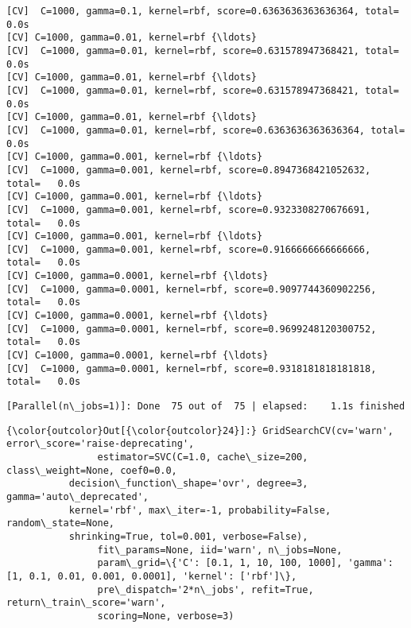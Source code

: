 \documentclass[11pt]{article}
\begin{document}
\begin{Verbatim}[commandchars=\\\{\}]
[CV]  C=1000, gamma=0.1, kernel=rbf, score=0.6363636363636364, total=   0.0s
[CV] C=1000, gamma=0.01, kernel=rbf {\ldots}
[CV]  C=1000, gamma=0.01, kernel=rbf, score=0.631578947368421, total=   0.0s
[CV] C=1000, gamma=0.01, kernel=rbf {\ldots}
[CV]  C=1000, gamma=0.01, kernel=rbf, score=0.631578947368421, total=   0.0s
[CV] C=1000, gamma=0.01, kernel=rbf {\ldots}
[CV]  C=1000, gamma=0.01, kernel=rbf, score=0.6363636363636364, total=   0.0s
[CV] C=1000, gamma=0.001, kernel=rbf {\ldots}
[CV]  C=1000, gamma=0.001, kernel=rbf, score=0.8947368421052632, total=   0.0s
[CV] C=1000, gamma=0.001, kernel=rbf {\ldots}
[CV]  C=1000, gamma=0.001, kernel=rbf, score=0.9323308270676691, total=   0.0s
[CV] C=1000, gamma=0.001, kernel=rbf {\ldots}
[CV]  C=1000, gamma=0.001, kernel=rbf, score=0.9166666666666666, total=   0.0s
[CV] C=1000, gamma=0.0001, kernel=rbf {\ldots}
[CV]  C=1000, gamma=0.0001, kernel=rbf, score=0.9097744360902256, total=   0.0s
[CV] C=1000, gamma=0.0001, kernel=rbf {\ldots}
[CV]  C=1000, gamma=0.0001, kernel=rbf, score=0.9699248120300752, total=   0.0s
[CV] C=1000, gamma=0.0001, kernel=rbf {\ldots}
[CV]  C=1000, gamma=0.0001, kernel=rbf, score=0.9318181818181818, total=   0.0s

    \end{Verbatim}

    \begin{Verbatim}[commandchars=\\\{\}]
[Parallel(n\_jobs=1)]: Done  75 out of  75 | elapsed:    1.1s finished

    \end{Verbatim}

\begin{Verbatim}[commandchars=\\\{\}]
{\color{outcolor}Out[{\color{outcolor}24}]:} GridSearchCV(cv='warn', error\_score='raise-deprecating',
                estimator=SVC(C=1.0, cache\_size=200, class\_weight=None, coef0=0.0,
           decision\_function\_shape='ovr', degree=3, gamma='auto\_deprecated',
           kernel='rbf', max\_iter=-1, probability=False, random\_state=None,
           shrinking=True, tol=0.001, verbose=False),
                fit\_params=None, iid='warn', n\_jobs=None,
                param\_grid=\{'C': [0.1, 1, 10, 100, 1000], 'gamma': [1, 0.1, 0.01, 0.001, 0.0001], 'kernel': ['rbf']\},
                pre\_dispatch='2*n\_jobs', refit=True, return\_train\_score='warn',
                scoring=None, verbose=3)
\end{Verbatim}
            
\end{document}

